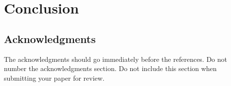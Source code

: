 \section{Conclusion}
\label{sec:conclusion}

\subsection*{Acknowledgments}

The acknowledgments should go immediately before the references. Do not number the acknowledgments section.
Do not include this section when submitting your paper for review.

